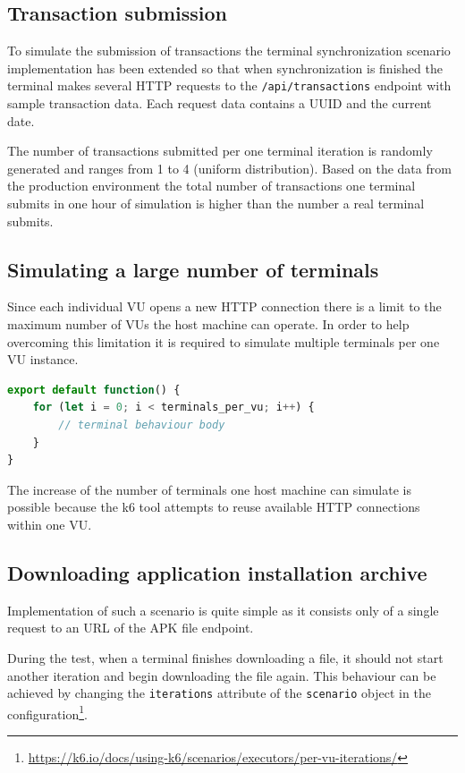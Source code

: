 \documentclass[12pt, a4paper]{article}
\begin{document}
\subsection{Transaction submission}
To simulate the submission of transactions the terminal synchronization scenario implementation has been extended so that when synchronization is finished the terminal makes several HTTP requests to the \texttt{/api/transactions} endpoint with sample transaction data.
Each request data contains a UUID and the current date.

The number of transactions submitted per one terminal iteration is randomly generated and ranges from 1 to 4 (uniform distribution).
Based on the data from the production environment the total number of transactions one terminal submits in one hour of simulation is higher than the number a real terminal submits.

\subsection{Simulating a large number of terminals}

Since each individual VU opens a new HTTP connection there is a limit to the maximum number of VUs the host machine can operate.
In order to help overcoming this limitation it is required to simulate multiple terminals per one VU instance.

\begin{lstlisting}[language=JavaScript, caption={Multiple terminals per one VU},captionpos=b]
export default function() {
    for (let i = 0; i < terminals_per_vu; i++) {
        // terminal behaviour body
    }
}
\end{lstlisting}

The increase of the number of terminals one host machine can simulate is possible because the k6 tool attempts to reuse available HTTP connections within one VU.

\subsection{Downloading application installation archive}
Implementation of such a scenario is quite simple as it consists only of a single request to an URL of the APK file endpoint.

During the test, when a terminal finishes downloading a file, it should not start another iteration and begin downloading the file again.
This behaviour can be achieved by changing the \texttt{iterations} attribute of the \texttt{scenario} object in the configuration\footnote{\url{https://k6.io/docs/using-k6/scenarios/executors/per-vu-iterations/}}.
\end{document}
